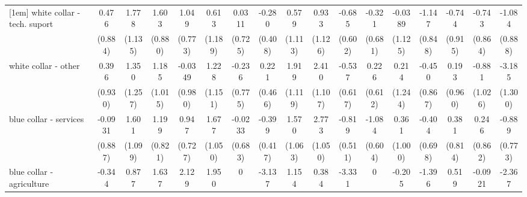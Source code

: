 {\begin{tabular}{l*{16}{c}}
[1em]
white collar - tech. suport&       0.476         &       1.778         &       1.603         &       1.049         &       0.613         &      0.0311         &      -0.280         &       0.579         &       0.933         &      -0.685         &      -0.321         &     -0.0389         &      -1.147         &      -0.744         &      -0.743         &      -1.084         \\
                    &     (0.884)         &     (1.135)         &     (0.880)         &     (0.773)         &     (1.189)         &     (0.725)         &     (0.408)         &     (1.113)         &     (1.126)         &     (0.602)         &     (0.681)         &     (1.125)         &     (0.848)         &     (0.915)         &     (0.864)         &     (0.888)         \\
[1em]
white collar - other&       0.396         &       1.350         &       1.185         &     -0.0349         &       1.228         &      -0.236         &       0.221         &       1.919         &       2.410\sym{*}  &      -0.537         &       0.226         &       0.214         &      -0.450         &       0.193         &      -0.881         &      -3.185\sym{*}  \\
                    &     (0.930)         &     (1.257)         &     (1.015)         &     (0.980)         &     (1.151)         &     (0.775)         &     (0.466)         &     (1.119)         &     (1.107)         &     (0.617)         &     (0.612)         &     (1.244)         &     (0.867)         &     (0.960)         &     (1.026)         &     (1.300)         \\
[1em]
blue collar - services&     -0.0931         &       1.601         &       1.199         &       0.947         &       1.677         &     -0.0233         &      -0.399         &       1.570         &       2.773\sym{**} &      -0.819         &      -1.084         &       0.361         &      -0.404         &       0.381         &       0.246         &      -0.889         \\
                    &     (0.887)         &     (1.099)         &     (0.821)         &     (0.727)         &     (1.050)         &     (0.683)         &     (0.417)         &     (1.063)         &     (1.050)         &     (0.511)         &     (0.604)         &     (1.000)         &     (0.698)         &     (0.814)         &     (0.862)         &     (0.773)         \\
[1em]
blue collar - agriculture&      -0.344         &       0.877         &       1.637         &       2.129\sym{*}  &       1.950         &           0         &      -3.137\sym{**} &       1.154         &       0.384         &      -3.331\sym{**} &           0         &      -0.205         &      -1.396         &       0.519         &     -0.0921         &      -2.367\sym{*}  \\

\end{tabular}}
